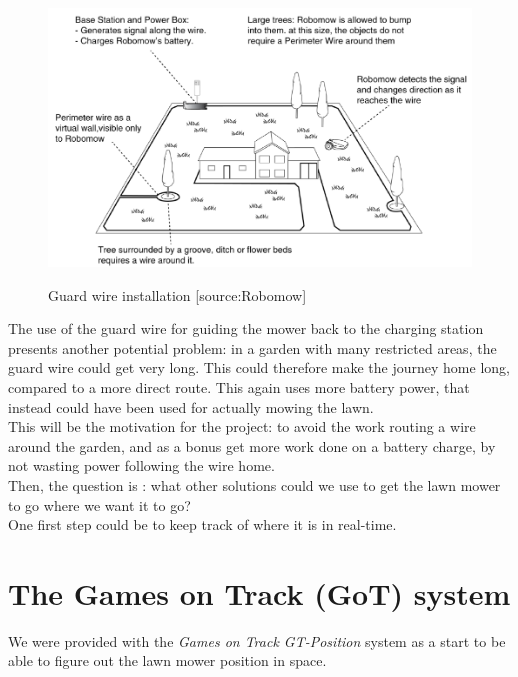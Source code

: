  
\begin{figure}[H]
\centering
\includegraphics[scale=0.6]{figures/robomow.png} 
\label{fig:robomow}
\caption{Guard wire installation [source:Robomow]} 
\end{figure}
\noindent

The use of the guard wire for guiding the mower back to the charging station presents another potential problem: in a garden with many restricted areas, the guard wire could get very long. This could therefore make the journey home long, compared to a more direct route. This again uses more battery power, that instead could have been used for actually mowing the lawn.\\

\noindent
This will be the motivation for the project: to avoid the work routing a wire around the garden, and as a bonus get more work done on a battery charge, by not wasting power following the wire home.\\

\noindent
Then, the question is : what other solutions could we use to get the lawn mower to go where we want it to go? \\
One first step could be to keep track of where it is in real-time.

\section{The Games on Track (GoT) system}
We were provided with the \emph{Games on Track GT-Position} system as a start to be able to figure out the lawn mower position in space.\\

